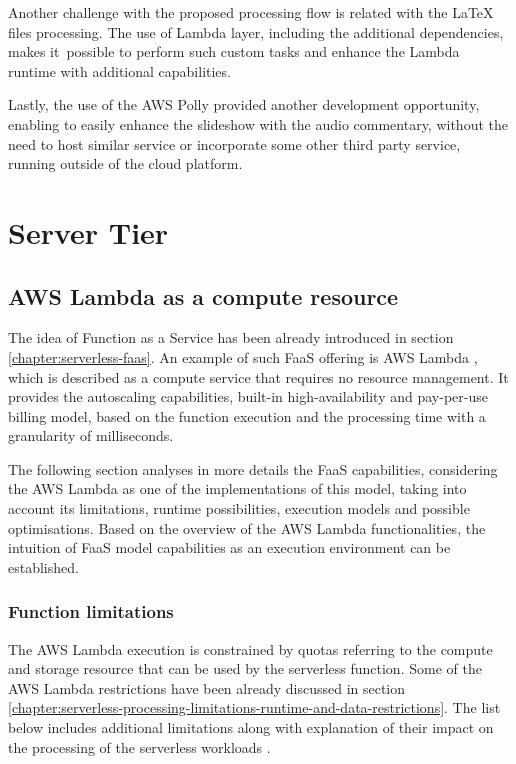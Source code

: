 Another challenge with the proposed processing flow is related with the LaTeX files processing. The use of Lambda layer, including the additional dependencies, makes it~possible to perform such custom tasks and enhance the Lambda runtime with additional capabilities.

Lastly, the use of the AWS Polly provided another development opportunity, enabling to easily enhance the slideshow with the audio commentary, without the need to host similar service or incorporate some other third party service, running outside of the cloud platform.

\section{Server Tier}

\subsection{AWS Lambda as a compute resource} \label{chapter:lambda-function-as-a-compute-resource}

The idea of Function as a Service has been already introduced in section \ref{chapter:serverless-faas}.
An example of such FaaS offering is AWS Lambda \cite{AWSLambda}, which is described as a compute service that requires no resource management. It provides the autoscaling capabilities, built-in high-availability and pay-per-use billing model, based on the function execution and the processing time with a granularity of milliseconds. 

The following section analyses in more details the FaaS capabilities, considering the AWS Lambda as one of the implementations of this model, taking into account its limitations, runtime possibilities, execution models and possible optimisations.
Based on the overview of the AWS Lambda functionalities, the intuition of FaaS model capabilities as an execution environment can be established.

\subsubsection{Function limitations} \label{chapter:lambda-function-limitations}

The AWS Lambda execution is constrained by quotas referring to the compute and storage resource that can be used by the serverless function.
Some of the AWS Lambda restrictions have been already discussed in section \ref{chapter:serverless-processing-limitations-runtime-and-data-restrictions}.
The list below includes additional limitations along with explanation of their impact on the processing of the serverless workloads \cite{AWSLambdaQuotas}.

